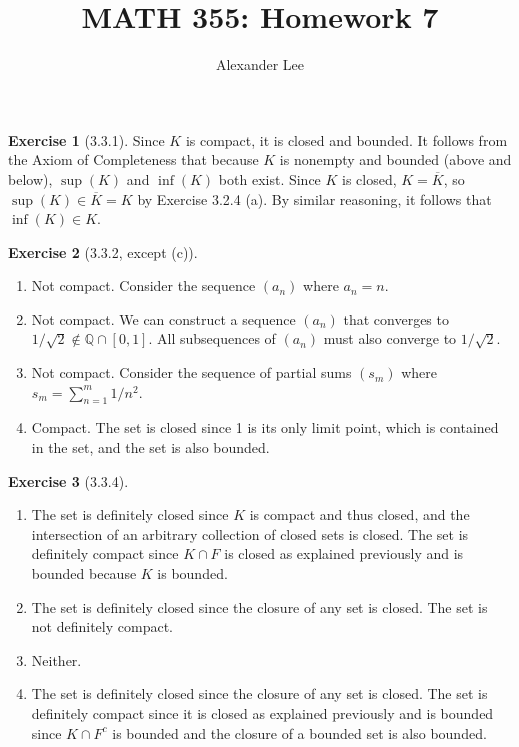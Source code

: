 \documentclass{amsart}
\title{MATH 355: Homework 7}
\author{Alexander Lee}
\theoremstyle{definition}
\newtheorem{exercise}{Exercise}
\newcommand{\Q}{\mathbb{Q}}
\begin{document}
\maketitle

\begin{exercise}[3.3.1]
  Since $K$ is compact, it is closed and bounded. It follows from the Axiom of
  Completeness that because $K$ is nonempty and bounded (above and below),
  $\sup(K)$ and $\inf(K)$ both exist. Since $K$ is closed, $K = \overline{K}$,
  so $\sup(K) \in \overline{K} = K$ by Exercise 3.2.4 (a). By similar reasoning,
  it follows that $\inf(K) \in K$.
\end{exercise}

\begin{exercise}[3.3.2, except (c)]
  \begin{enumerate}[label={(\alph*)}]
    \item Not compact. Consider the sequence $(a_n)$ where $a_n = n$.
    \item Not compact. We can construct a sequence $(a_n)$ that converges to $1
      / \sqrt{2} \notin \Q \cap [0, 1]$. All subsequences of $(a_n)$ must also
      converge to $1 / \sqrt{2}$.
    \addtocounter{enumi}{1}
    \item Not compact. Consider the sequence of partial sums $(s_m)$ where $s_m
      = \sum_{n=1}^m 1 / n^2$.
    \item Compact. The set is closed since 1 is its only limit point, which is
      contained in the set, and the set is also bounded.
  \end{enumerate}
\end{exercise}

\begin{exercise}[3.3.4]
  \begin{enumerate}[label={(\alph*)}]
    \item The set is definitely closed since $K$ is compact and thus closed,
      and the intersection of an arbitrary collection of closed sets is closed.
      The set is definitely compact since $K \cap F$ is closed as explained
      previously and is bounded because $K$ is bounded.
    \item The set is definitely closed since the closure of any set is closed.
      The set is not definitely compact.
    \item Neither.
    \item The set is definitely closed since the closure of any set is closed.
      The set is definitely compact since it is closed as explained previously
      and is bounded since $K \cap F^c$ is bounded and the closure of a bounded
      set is also bounded.
  \end{enumerate}
\end{exercise}
\end{document}
